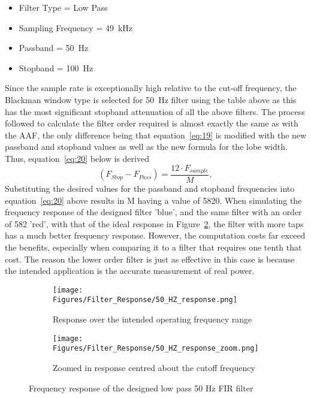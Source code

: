 \begin{itemize}
    \item Filter Type = Low Pass 
    \item Sampling Frequency = \qty{49}{\kHz} 
    \item Passband = \qty{50}{\hertz} 
    \item Stopband = \qty{100}{\hertz} 
\end{itemize}
Since the sample rate is exceptionally high relative to the cut-off frequency, the Blackman window type is selected for \qty{50}{\hertz} filter using the table above as this has the most significant stopband attenuation of all the above filters. The process followed to calculate the filter order required is almost exactly the same as with the AAF, the only difference being that equation~\ref{eq:19} is modified with the new passband and stopband values as well as the new formula for the lobe width. Thus, equation~\ref{eq:20} below is derived
\begin{equation}
    (F_{Stop} - F_{Pass}) = \frac{12 \cdot F_{sample}}{M},
    \label{eq:20}
\end{equation}
Substituting the desired values for the passband and stopband frequencies into equation~\ref{eq:20} above results in M having a value of 5820. When simulating the frequency response of the designed filter 'blue', and the same filter with an order of 582 'red', with that of the ideal response in Figure~\ref{fig:50HZ_Response_zoom}, the filter with more taps has a much better frequency response. However, the computation costs far exceed the benefits, especially when comparing it to a filter that requires one tenth that cost. The reason the lower order filter is just as effective in this case is because the intended application is the accurate measurement of real power.   
\begin{figure}[H]
    \centering
    \begin{subfigure}[b]{0.495\textwidth}
        \centering
        \texttt{[image: Figures/Filter\_Response/50\_HZ\_response.png]}
        \caption{Response over the intended operating frequency range}
        \label{fig:50HZ_Response}
    \end{subfigure}
    \hfill
    \begin{subfigure}[b]{0.495\textwidth}
        \centering
        \texttt{[image: Figures/Filter\_Response/50\_HZ\_response\_zoom.png]}
        \caption{Zoomed in response centred about the cutoff frequency}
        \label{fig:50HZ_Response_zoom}
    \end{subfigure}
    \caption{Frequency response of the designed low pass 50 Hz FIR filter}
    \label{fig:FIR_50}
\end{figure}

